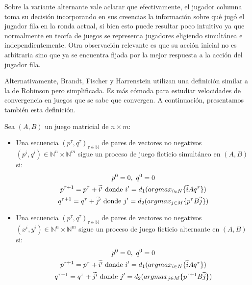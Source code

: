 Sobre la variante alternante vale aclarar que efectivamente, el jugador columna toma su decisión incorporando en sus creencias la información sobre qué jugó el jugador fila en la ronda actual, si bien esto puede resultar poco intuitivo ya que normalmente en teoría de juegos se representa jugadores eligiendo simultánea e independientemente. Otra observación relevante es que su acción inicial no es arbitraria sino que ya se encuentra fijada por la mejor respuesta a la acción del jugador fila.

Alternativamente, Brandt, Fischer y Harrenstein \cite{brandt:rate:convergence} utilizan una definición similar a la de Robinson \cite{robinson:zerosum} pero simplificada. Es más cómoda para estudiar velocidades de convergencia en juegos que se sabe que convergen. A continuación, presentamos también esta definición.

\begin{definition} \label{def:fp:brandt}
    Sea $(A, B)$ un juego matricial de $n \times m$:
    \begin{itemize}
        \item Una secuencia $(p^\tau, q^\tau)_{\tau \in \mathbb{N}}$ de pares de vectores no negativos $(p^i, q^i) \in \mathbb{N}^n \times \mathbb{N}^m$ sigue un proceso de juego ficticio simultáneo en $(A, B)$ si:
        \begin{gather*}
            p^0 = \boldmath{0},\ q^0 = \boldmath{0} \\
            p^{\tau+1} = p^{\tau} + \widetilde{i'} \text{\ donde $i' = d_1(argmax_{i \in N}\{\widetilde{i}Aq^\tau\})$} \\
            q^{\tau+1} = q^{\tau} + \widetilde{j'} \text{\ donde $j' = d_2(argmax_{j \in M}\{p^{\tau}B\widetilde{j}\})$}
        \end{gather*}
        \item Una secuencia $(p^\tau, q^\tau)_{\tau \in \mathbb{N}}$  de pares de vectores no negativos $(x^i, y^i) \in \mathbb{N}^n \times \mathbb{N}^m$ sigue un proceso de juego ficticio alternante en $(A, B)$ si:
        \begin{gather*}
            p^0 = \boldmath{0},\ q^0 = \boldmath{0} \\
            p^{\tau+1} = p^{\tau} + \widetilde{i'} \text{\ donde $i' = d_1(argmax_{i \in N}\{\widetilde{i}Aq^\tau\})$} \\
            q^{\tau+1} = q^{\tau} + \widetilde{j'} \text{\ donde $j' = d_2(argmax_{j \in M}\{p^{\tau+1}B\widetilde{j}\})$}
        \end{gather*}
    \end{itemize}
\end{definition}


